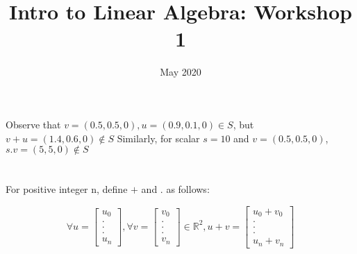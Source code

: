 \documentclass{article}
\title{Intro to Linear Algebra: Workshop 1}
\date{May 2020}
\begin{document}
\maketitle

\section{}
Observe that $v = (0.5, 0.5, 0), u = (0.9, 0.1, 0) \in S$, 
\newline 
but $v + u = (1.4, 0.6, 0) \notin S$
\newline
\newline
Similarly, for scalar $s = 10$ and $v = (0.5, 0.5, 0)$, $s.v = (5, 5, 0) \notin S$
\section{}
For positive integer n, define $+$ and $.$ as follows:\newline

$$\forall 
u=\left[\begin{array}{c}u_0 \\.\\.\\.\\u_n\end{array}\right],
\forall
v=\left[\begin{array}{c}v_0 \\.\\.\\.\\v_n\end{array}\right]
\in \mathbb{R}^2, u + v = \left[\begin{array}{c}u_0 + v_0\\.\\.\\.\\u_n + v_n\end{array}\right]$$ 
\end{document}
